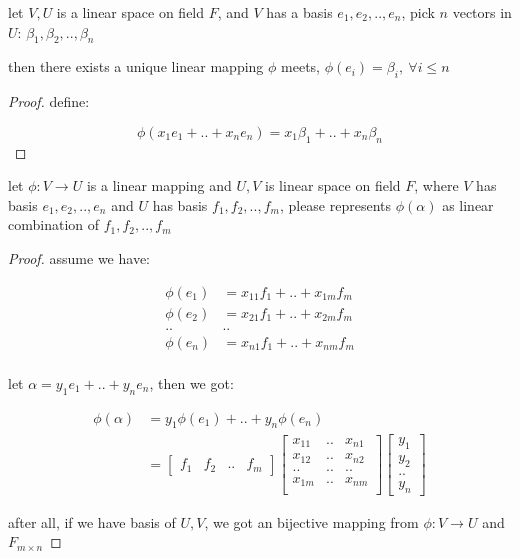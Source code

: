 \begin{exercise}
    let $V, U$ is a linear space on field $F$, and $V$ has a basis $e_1,e_2,..,e_n$, pick
    $n$ vectors in $U$: $\beta_1, \beta_2, .., \beta_n$

    then there exists a unique linear mapping $\phi$ meets, $\phi(e_i) = \beta_i,\: \forall i \le n$
\end{exercise}

\begin{proof}
    define: 

    \[
        \phi(x_1e_1 + .. + x_n e_n) = x_1\beta_1 + .. + x_n\beta_n
    \]
\end{proof}

\begin{exercise}
    let $\phi: V\to U$ is a linear mapping and $U, V$ is linear space on field $F$, where $V$ has  basis $e_1,e_2,..,e_n$ 
    and $U$ has basis $f_1,f_2,..,f_m$, please represents $\phi(\alpha)$ as linear combination of $f_1,f_2,..,f_m$
\end{exercise}

\begin{proof}
    assume we have:

    \begin{align*}
        \phi(e_1) &= x_{11}f_1 + .. + x_{1m}f_m \\
        \phi(e_2) &= x_{21}f_1 + .. + x_{2m}f_m \\
        .. & .. \\
        \phi(e_n) &= x_{n1}f_1 + .. + x_{nm}f_m \\
    \end{align*}

    let $\alpha = y_1e_1 + .. + y_ne_n$, then we got:

    \begin{align*}
        \phi(\alpha) &= y_1\phi(e_1) + .. + y_n \phi(e_n) \\
        &= \begin{bmatrix}
            f_1 & f_2 & .. & f_m
        \end{bmatrix} \begin{bmatrix}
            x_{11} & .. & x_{n1} \\
            x_{12} & .. & x_{n2}\\
            .. & .. &  .. \\
            x_{1m} & .. & x_{nm}\\
        \end{bmatrix} \begin{bmatrix}
            y_1 \\
            y_2 \\
            .. \\
            y_n
        \end{bmatrix}
    \end{align*}


    after all, if we have basis of $U,V$, we got an bijective mapping from $\phi: V \to U$ and $F_{m \times n}$
\end{proof}

